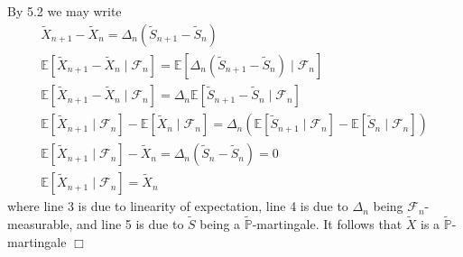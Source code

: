 \documentclass{article}
\begin{document}
\subsection{}
By 5.2 we may write
\begin{gather}
\widetilde{X}_{n+1} - \widetilde{X}_n = \Delta_n \left(\widetilde{S}_{n+1} - \widetilde{S}_n \right)\\
\mathbb{E}[\widetilde{X}_{n+1} - \widetilde{X}_n \;|\; \mathcal{F}_n] = \mathbb{E}[\Delta_n \left(\widetilde{S}_{n+1} - \widetilde{S}_n \right) \;|\; \mathcal{F}_n]\\
\mathbb{E}[\widetilde{X}_{n+1} - \widetilde{X}_n \;|\; \mathcal{F}_n] = \Delta_n\mathbb{E}[\widetilde{S}_{n+1} - \widetilde{S}_n \;|\; \mathcal{F}_n]\\
\mathbb{E}[\widetilde{X}_{n+1} \;|\; \mathcal{F}_n] - \mathbb{E}[\widetilde{X}_{n} \;|\; \mathcal{F}_n] = \Delta_n \left( \mathbb{E}[\widetilde{S}_{n+1} \;|\; \mathcal{F}_n] - \mathbb{E}[\widetilde{S}_n \;|\; \mathcal{F}_n]\right)\\
\mathbb{E}[\widetilde{X}_{n+1} \;|\; \mathcal{F}_n] - \widetilde{X}_{n} = \Delta_n \left( \widetilde{S}_n - \widetilde{S}_n \right) = 0\\
\mathbb{E}[\widetilde{X}_{n+1} \;|\; \mathcal{F}_n] = \widetilde{X}_n
\end{gather}
where line 3 is due to linearity of expectation, line 4 is due to $\Delta_n$ being $\mathcal{F}_n$-measurable, and line 5 is due to $\widetilde{S}$ being a $\widetilde{\mathbb{P}}$-martingale. It follows that $\widetilde{X}$ is a $\widetilde{\mathbb{P}}$-martingale $\Box$
\end{document}
